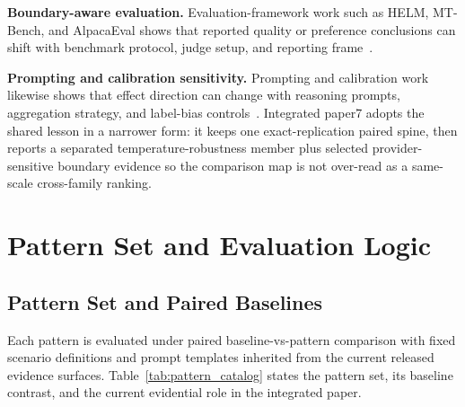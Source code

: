\documentclass[11pt,a4paper]{article}
\begin{document}
\textbf{Boundary-aware evaluation.}
Evaluation-framework work such as HELM, MT-Bench, and AlpacaEval shows that reported quality or preference conclusions can shift with benchmark protocol, judge setup, and reporting frame~\cite{liang2022helm,zheng2023mtbench,dubois2024alpacaeval}.

\textbf{Prompting and calibration sensitivity.}
Prompting and calibration work likewise shows that effect direction can change with reasoning prompts, aggregation strategy, and label-bias controls~\cite{kojima2022zeroshot,wang2023selfconsistency,zhao2021calibrate}. Integrated paper7 adopts the shared lesson in a narrower form: it keeps one exact-replication paired spine, then reports a separated temperature-robustness member plus selected provider-sensitive boundary evidence so the comparison map is not over-read as a same-scale cross-family ranking.

\section{Pattern Set and Evaluation Logic}
\label{sec:method}

\subsection{Pattern Set and Paired Baselines}

Each pattern is evaluated under paired baseline-vs-pattern comparison with fixed scenario definitions and prompt templates inherited from the current released evidence surfaces. Table~\ref{tab:pattern_catalog} states the pattern set, its baseline contrast, and the current evidential role in the integrated paper.
\end{document}

